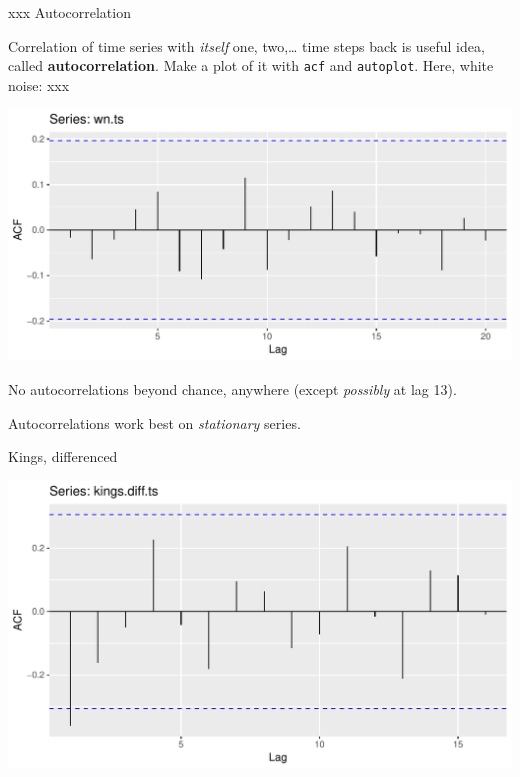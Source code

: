 \documentclass[ignorenonframetext,]{beamer}
\newenvironment{Shaded}{\begin{snugshade}}{\end{snugshade}}
\newcommand{\DataTypeTok}[1]{\textcolor[rgb]{0.13,0.29,0.53}{#1}}
\newcommand{\KeywordTok}[1]{\textcolor[rgb]{0.13,0.29,0.53}{\textbf{#1}}}
\newcommand{\NormalTok}[1]{#1}
\newcommand{\OperatorTok}[1]{\textcolor[rgb]{0.81,0.36,0.00}{\textbf{#1}}}
\newcommand{\StringTok}[1]{\textcolor[rgb]{0.31,0.60,0.02}{#1}}
\begin{document}
\begin{frame}[fragile]{xxx Autocorrelation}
\protect\hypertarget{xxx-autocorrelation}{}

Correlation of time series with \emph{itself} one, two,\ldots{} time
steps back is useful idea, called \textbf{autocorrelation}. Make a plot
of it with \texttt{acf} and \texttt{autoplot}. Here, white noise: xxx

\begin{Shaded}
\end{Shaded}

\includegraphics{figure/unnamed-chunk-30-1.pdf}

No autocorrelations beyond chance, anywhere (except \emph{possibly} at
lag 13).

Autocorrelations work best on \emph{stationary} series.

\end{frame}

\begin{frame}[fragile]{Kings, differenced}
\protect\hypertarget{kings-differenced}{}

\begin{Shaded}
\end{Shaded}

\includegraphics{figure/unnamed-chunk-31-1.pdf}

\end{frame}
\end{document}
